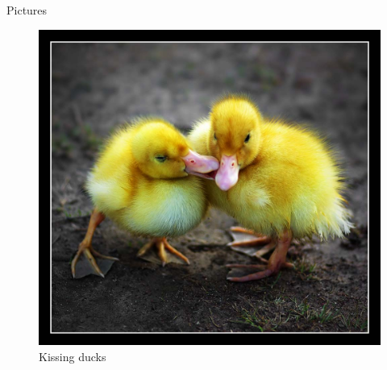 \documentclass[utf8, a4paper]{beamer}
\begin{document}
\begin{frame}{Pictures}

  \begin{figure}[t]
    \centering
    \includegraphics[height=\dimexpr11\textheight/16\relax]{ducks}
    \caption{Kissing ducks}
  \end{figure}
\end{frame}
\end{document}
